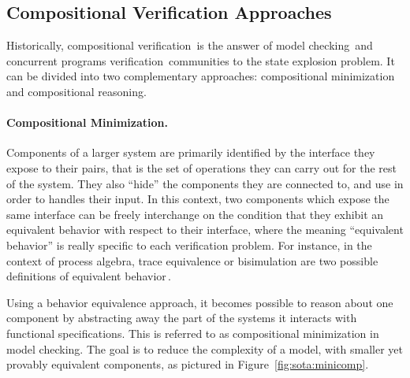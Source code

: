\subsection{Compositional Verification Approaches}
\label{subsec:sota:compverif}

Historically, compositional verification\,\cite{peng1998survey} is the answer of
model checking\,\cite{mcmillan1989compositional} and concurrent programs
verification\,\cite{jones1983tentative} communities to the state explosion
problem.
%
It can be divided into two complementary approaches: compositional minimization
and compositional reasoning.

\paragraph{Compositional Minimization.}
%
Components of a larger system are primarily identified by the interface they
expose to their pairs, that is the set of operations they can carry out for the
rest of the system.
%
They also ``hide'' the components they are connected to, and use in order to
handles their input.
%
In this context, two components which expose the same interface can be freely
interchange on the condition that they exhibit an equivalent behavior with
respect to their interface, where the meaning ``equivalent behavior'' is really
specific to each verification problem.
%
For instance, in the context of process algebra, trace equivalence or
bisimulation are two possible definitions of equivalent
behavior\,\cite{fokkink2013pa}.

Using a behavior equivalence approach, it becomes possible to reason about one
component by abstracting away the part of the systems it interacts with
functional specifications.
%
This is referred to as compositional minimization in model checking.
%
The goal is to reduce the complexity of a model, with smaller yet provably
equivalent components, as pictured in Figure~\ref{fig:sota:minicomp}.
%


